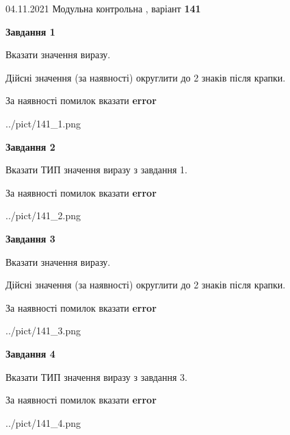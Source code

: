 \documentclass[11pt, ukrainian]{article}
\begin{document}
{04.11.2021 Модульна контрольна , варіант  \No \textbf { 141 }\par}
{
\begin {large}
{\begin {center}\textbf{Завдання 1}\end {center}}\par
Вказати значення виразу. \par
Дійсні значення (за наявності) округлити до 2 знаків після крапки. \par
За наявності помилок вказати \textbf{error}

\begin{center}
	{../pict/141_1.png}
\end{center}
\newpage

{\begin {center}\textbf{Завдання 2}\end {center}}\par
Вказати ТИП значення виразу з завдання 1. \par
За наявності помилок вказати \textbf{error}

\begin{center}
	{../pict/141_2.png}
\end{center}
\newpage

{\begin {center}\textbf{Завдання 3}\end {center}}\par
Вказати значення виразу. \par
Дійсні значення (за наявності) округлити до 2 знаків після крапки. \par
За наявності помилок вказати \textbf{error}

\begin{center}
	{../pict/141_3.png}
\end{center}
\newpage

{\begin {center}\textbf{Завдання 4}\end {center}}\par
Вказати ТИП значення виразу з завдання 3. \par
За наявності помилок вказати \textbf{error}

\begin{center}
	{../pict/141_4.png}
\end{center}
\newpage


\end{large}}
\end{document}
